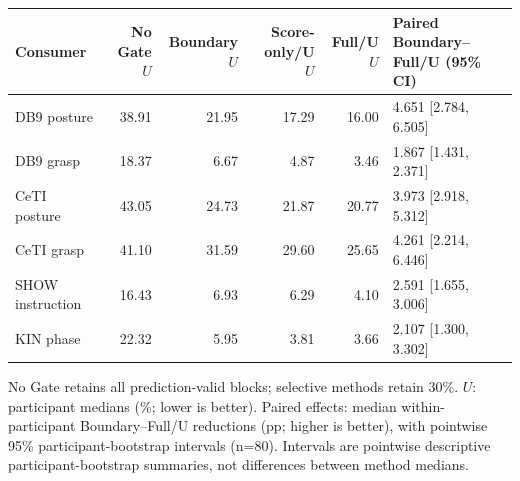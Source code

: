 \begingroup
\small
\setlength{\tabcolsep}{3pt}
\renewcommand{\arraystretch}{1.05}
\begin{tabular}{lrrrrl}
\toprule
Consumer & No Gate $U$ & Boundary $U$ & Score-only/U $U$ & Full/U $U$ & Paired Boundary--Full/U (95\% CI)\\
\midrule
DB9 posture & 38.91 & 21.95 & 17.29 & 16.00 & 4.651 [2.784, 6.505]\\
DB9 grasp & 18.37 & 6.67 & 4.87 & 3.46 & 1.867 [1.431, 2.371]\\
CeTI posture & 43.05 & 24.73 & 21.87 & 20.77 & 3.973 [2.918, 5.312]\\
CeTI grasp & 41.10 & 31.59 & 29.60 & 25.65 & 4.261 [2.214, 6.446]\\
SHOW instruction & 16.43 & 6.93 & 6.29 & 4.10 & 2.591 [1.655, 3.006]\\
KIN phase & 22.32 & 5.95 & 3.81 & 3.66 & 2.107 [1.300, 3.302]\\
\bottomrule
\end{tabular}
\par\smallskip
\begin{minipage}{\linewidth}\footnotesize
No Gate retains all prediction-valid blocks; selective methods retain 30\%. $U$: participant medians (\%; lower is better). Paired effects: median within-participant Boundary--Full/U reductions (pp; higher is better), with pointwise 95\% participant-bootstrap intervals (n=80). Intervals are pointwise descriptive participant-bootstrap summaries, not differences between method medians.
\end{minipage}
\endgroup
